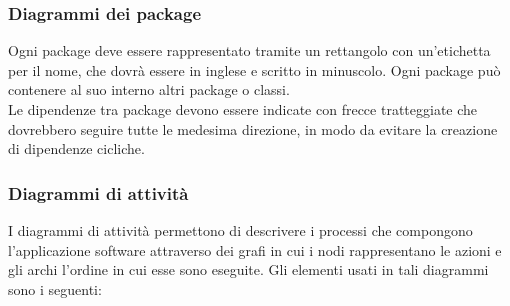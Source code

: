     	\subsubsection*{Diagrammi dei package}
    	Ogni package deve essere rappresentato tramite un rettangolo con un'etichetta per il nome, che dovrà essere in inglese e scritto in minuscolo. Ogni package può contenere al suo interno altri package o classi. \\
    	Le dipendenze tra package devono essere indicate con frecce tratteggiate che dovrebbero seguire tutte le medesima direzione, in modo da evitare la creazione di dipendenze cicliche. 
    	
    	\subsubsection*{Diagrammi di attività}
    	I diagrammi di attività permettono di descrivere i processi che compongono l'applicazione software attraverso dei grafi in cui i nodi rappresentano le azioni e gli archi l'ordine in cui esse sono eseguite.
    	Gli elementi usati in tali diagrammi sono i seguenti: 
